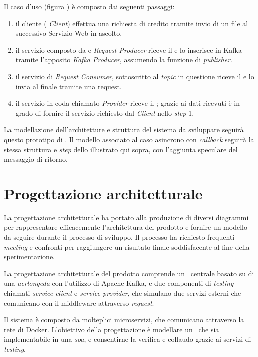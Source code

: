 \noindent
Il caso d'uso (figura \thefigure) è composto dai seguenti passaggi:
\begin{enumerate}
  \item il cliente (\textit{ Client}) effettua una richiesta di credito tramite invio di un file  al successivo Servizio Web in ascolto.
  \item il servizio composto da   e \textit{Request Producer} riceve il  e lo inserisce in Kafka tramite l'apposito \textit{Kafka Producer}, assumendo la funzione di \textit{publisher}.
  \item il servizio di \textit{Request Consumer}, sottoscritto al \textit{topic} in questione riceve il  e lo invia al  finale tramite una  request.
  \item il servizio in coda chiamato  \textit{Provider} riceve il ; grazie ai dati ricevuti è in grado di fornire il servizio richiesto dal \textit{Client} nello \textit{step} 1.
\end{enumerate}

La modellazione dell'architetture e struttura del sistema da sviluppare seguirà questo prototipo di .
Il modello associato al caso asincrono con \textit{callback} seguirà la stessa struttura e \textit{step} dello  illustrato qui sopra, con l'aggiunta speculare del messaggio di ritorno.

\section{Progettazione architetturale}\label{sec:progettazione}

La progettazione architetturale ha portato alla produzione di diversi diagrammi  per rappresentare efficacemente l'architettura del prodotto e fornire un modello da seguire durante il processo di sviluppo.
Il processo ha richiesto frequenti \textit{meeting} e confronti per raggiungere un risultato finale soddisfacente al fine della sperimentazione.

La progettazione architetturale del prodotto comprende un \middleware\ centrale basato su di una \textit{acrlong{eda}} con l'utilizzo di Apache Kafka, e due componenti di \textit{testing} chiamati \textit{service client} e \textit{service provider}, che simulano due servizi esterni che comunicano con il middleware attraverso  \textit{request}.

Il sistema è composto da molteplici microservizi, che comunicano attraverso la rete di Docker.
L'obiettivo della progettazione è modellare un \middleware\ che sia implementabile in una \textit{\acrlong{soa}}, e consentirne la verifica e collaudo grazie ai servizi di \textit{testing}.

